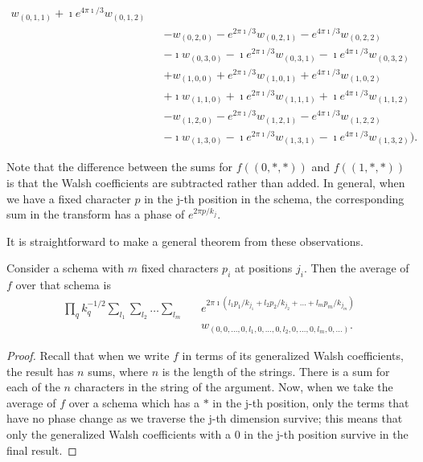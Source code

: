 \begin{example}
\begin{eqnarray}
	w_{(0,1,1)}+\imath e^{4\pi\imath/3} w_{(0,1,2)} \nonumber\\
&& -w_{(0,2,0)}-e^{2\pi\imath/3}w_{(0,2,1)}-e^{4\pi\imath/3}w_{(0,2,2)}
	\nonumber\\
&&-\imath w_{(0,3,0)} -\imath e^{2\pi\imath/3} w_{(0,3,1)} 
	-\imath e^{4\pi\imath/3} w_{(0,3,2)} \nonumber\\
&&+ w_{(1,0,0)} + e^{2\pi\imath/3} w_{(1,0,1)}+ e^{4\pi\imath/3} w_{(1,0,2)}
	\nonumber\\
&& + \imath w_{(1,1,0)} + \imath e^{2\pi\imath/3} w_{(1,1,1)}+
	\imath e^{4\pi\imath/3} w_{(1,1,2)} \nonumber\\
&& -w_{(1,2,0)}-e^{2\pi\imath/3}w_{(1,2,1)}-e^{4\pi\imath/3}w_{(1,2,2)}
		\nonumber\\
&& -\imath w_{(1,3,0)} -\imath e^{2\pi\imath/3} w_{(1,3,1)}
	-\imath e^{4\pi\imath/3} w_{(1,3,2)}
).
\end{eqnarray}
\end{example}
Note that the difference between the sums for $f((0,*,*))$ and $f((1,*,*))$
is that the Walsh coefficients are subtracted rather than added.  In
general, when we have a fixed character $p$ in the j-th position in the schema,
the corresponding sum in the transform has a phase of $e^{2 \pi p/k_j}$.

It is straightforward to make a general theorem from these observations.
\begin{theorem}
Consider a schema with $m$ fixed characters $p_i$ at positions $j_i$.
Then the average of $f$ over that schema is
\begin{eqnarray}
\prod_q{k_q^{-1/2}}
\sum_{l_1} \sum_{l_2} \ldots \sum_{l_m} & &
e^{2 \pi \imath (l_1 p_1/k_{j_1}+l_2 p_2/k_{j_2} 
	+\ldots+l_m p_m/k_{j_m})}\nonumber\\
&& w_{(0,0,\ldots,0,l_1,0,\ldots,0,l_2,0,\ldots,0,l_m,0,\ldots)}.
			\label{schematowalsh}
\end{eqnarray}
\end{theorem}

\begin{proof}
Recall that when we write $f$ in terms of its generalized Walsh coefficients, the
result has $n$ sums, where $n$ is the length of the strings.  There is
a sum for each of the $n$ characters in the string of the argument.  Now,
when we take the average of $f$ over a schema which has a $*$ in the j-th
position, only the terms that have no phase change as we traverse the j-th
dimension survive; this means that only the generalized Walsh coefficients with a $0$
in the j-th position survive in the final result.
\end{proof}

